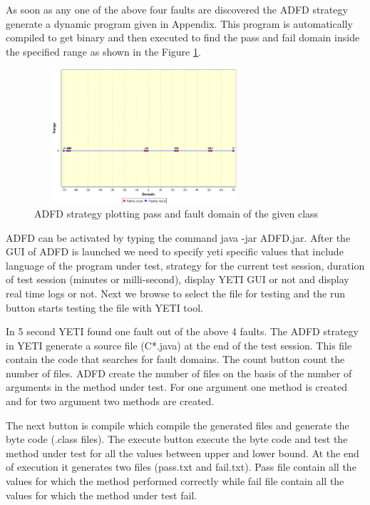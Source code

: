 \documentclass{acm_proc_article-sp}
\begin{document}

As soon as any one of the above four faults are discovered the ADFD strategy generate a dynamic program given in Appendix. This program is automatically compiled to get binary and then executed to find the pass and fail domain inside the specified range as shown in the Figure \ref{fig:ADFD-example}.


\begin{figure}[ht]
\centering
\includegraphics[width=8.2cm,height=5cm]{pointDomainOneArgument.png}
\caption{ADFD strategy plotting pass and fault domain of the given class}
\label{fig:ADFD-example}
\end{figure}



ADFD can be activated by typing the command java -jar ADFD.jar. After the GUI of ADFD is launched we need to specify yeti specific values that include language of the program under test, strategy for the current test session, duration of test session (minutes or milli-second), display YETI GUI or not and display real time logs or not. Next we browse to select the file for testing and the run button starts testing the file with YETI tool. 

In 5 second YETI found one fault out of the above 4 faults. The ADFD strategy in YETI generate a source file (C*.java) at the end of the test session. This file contain the code that searches for fault domains. The count button count the number of files. ADFD create the number of files on the basis of the number of arguments in the method under test. For one argument one method is created and for two argument two methods are created. 

The next button is compile which compile the generated files and generate the byte code (.class files). The execute button execute the byte code and test the method under test for all the values between upper and lower bound. At the end of execution it generates two files (pass.txt and fail.txt). Pass file contain all the values for which the method performed correctly while fail file contain all the values for which the method under test fail.
\end{document}
